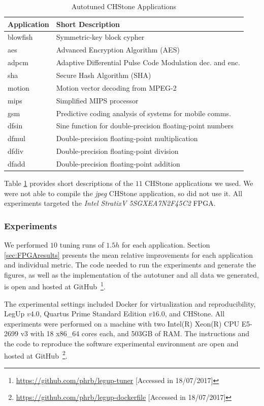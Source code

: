 \begin{table}[htpb]
\centering
\begin{tabular}{@{}p{}p{}@{}}
\toprule
 Application & Short Description \\ \midrule
 blowfish & Symmetric-key block cypher \\
 aes & Advanced Encryption Algorithm (AES) \\
 adpcm & Adaptive Differential Pulse Code Modulation dec. and enc. \\
 sha & Secure Hash Algorithm (SHA) \\
 motion & Motion vector decoding from MPEG-2 \\
 mips & Simplified MIPS processor \\
 gsm & Predictive coding analysis of systems for mobile comms. \\
 dfsin & Sine function for double-precision floating-point numbers \\
 dfmul & Double-precision floating-point multiplication \\
 dfdiv & Double-precision floating-point division \\
 dfadd & Double-precision floating-point addition \\ \bottomrule
\end{tabular}
\caption{Autotuned CHStone Applications}
\label{tab:chstone}
\end{table}

Table \ref{tab:chstone} provides short descriptions of the $11$ CHStone
applications we used. We were not able to compile the \textit{jpeg} CHStone
application, so did not use it.  All experiments targeted the \textit{Intel
StratixV 5SGXEA7N2F45C2} FPGA.

\subsubsection{Experiments}

We performed $10$ tuning runs of $1.5h$ for each application.  Section
\ref{sec:FPGAresults} presents the mean relative improvements for each application
and individual metric. The code needed to run the experiments and generate the
figures, as well as the implementation of the autotuner and all data we
generated, is open and hosted at
GitHub~\footnote{\url{https://github.com/phrb/legup-tuner} [Accessed in
18/07/2017]}.

The experimental settings included Docker for virtualization and
reproducibility, LegUp $v4.0$, Quartus Prime Standard Edition $v16.0$, and
CHStone. All experiments were performed on a machine with two Intel(R) Xeon(R)
CPU E5-2699 v3 with 18 x86\_64 cores each, and 503GB of RAM.  The instructions
and the code to reproduce the software experimental environment are open and
hosted at GitHub~\footnote{\url{https://github.com/phrb/legup-dockerfile}
[Accessed in 18/07/2017]}.

